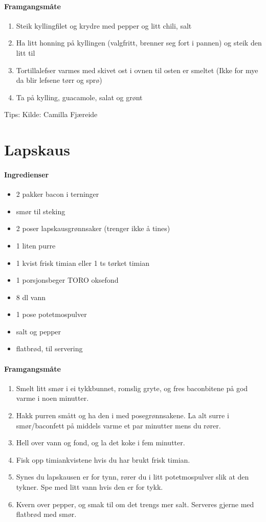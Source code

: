 \documentclass[12pt,a4paper]{book}
\begin{document}
\paragraph{Framgangsmåte}
\begin{enumerate}[noitemsep]
	\item Steik kyllingfilet og krydre med pepper og litt chili, salt
	\item Ha litt honning på kyllingen (valgfritt, brenner seg fort i pannen) og steik den litt til
	\item Tortillalefser varmes med skivet ost i ovnen til osten er smeltet (Ikke for mye da blir lefsene tørr og sprø)
	\item Ta på kylling, guacamole, salat og grønt
\end{enumerate}

Tips:
Kilde: Camilla Fjæreide
\clearpage{}
\clearpage{}\section{﻿Lapskaus}

\paragraph{Ingredienser}
\begin{itemize}[noitemsep]
	\item 2 pakker bacon i terninger
	\item smør til steking
	\item 2 poser lapskausgrønnsaker (trenger ikke å tines)
	\item 1 liten purre
	\item 1 kvist frisk timian eller 1 ts tørket timian
	\item 1 porsjonsbeger TORO oksefond
	\item 8 dl vann
	\item 1 pose potetmospulver
	\item salt og pepper
	\item flatbrød, til servering
\end{itemize}

\paragraph{Framgangsmåte}
\begin{enumerate}[noitemsep]
	\item Smelt litt smør i ei tykkbunnet, romslig gryte, og fres baconbitene på god varme i noen minutter.
	\item Hakk purren smått og ha den i med posegrønnsakene. La alt surre i smør/baconfett på middels varme et par minutter mens du rører.
	\item Hell over vann og fond, og la det koke i fem minutter.
	\item Fisk opp timiankvistene hvis du har brukt frisk timian.
	\item Synes du lapskausen er for tynn, rører du i litt potetmospulver slik at den tykner. Spe med litt vann hvis den er for tykk.
	\item Kvern over pepper, og smak til om det trengs mer salt. Serveres gjerne med flatbrød med smør.
\end{enumerate}
\end{document}
